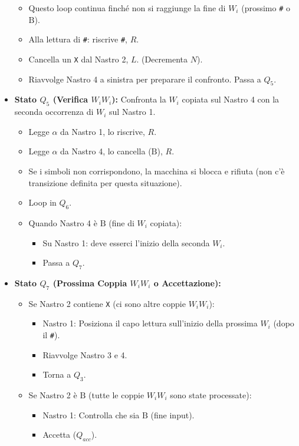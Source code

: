 \documentclass[a4paper]{article}
\newcommand{\B}{\text{B}} %
\begin{document}
\begin{itemize}
\begin{itemize}
            \item Questo loop continua finché non si raggiunge la fine di $W_i$ (prossimo \texttt{\#} o $\B$).
            \item Alla lettura di \texttt{\#}: riscrive \texttt{\#}, $R$.
            \item Cancella un \texttt{X} dal Nastro 2, $L$. (Decrementa $N$).
            \item Riavvolge Nastro 4 a sinistra per preparare il confronto. Passa a $Q_5$.
        \end{itemize}
    \item \textbf{Stato $Q_5$ (Verifica $W_i W_i$):}
        Confronta la $W_i$ copiata sul Nastro 4 con la seconda occorrenza di $W_i$ sul Nastro 1.
        \begin{itemize}
            \item Legge $\alpha$ da Nastro 1, lo riscrive, $R$.
            \item Legge $\alpha$ da Nastro 4, lo cancella ($\B$), $R$.
            \item Se i simboli non corrispondono, la macchina si blocca e rifiuta (non c'è transizione definita per questa situazione).
            \item Loop in $Q_6$.
            \item Quando Nastro 4 è $\B$ (fine di $W_i$ copiata):
                \begin{itemize}
                    \item Su Nastro 1: deve esserci l'inizio della seconda $W_i$.
                    \item Passa a $Q_7$.
                \end{itemize}
        \end{itemize}
    \item \textbf{Stato $Q_7$ (Prossima Coppia $W_i W_i$ o Accettazione):}
        \begin{itemize}
            \item Se Nastro 2 contiene \texttt{X} (ci sono altre coppie $W_i W_i$):
                \begin{itemize}
                    \item Nastro 1: Posiziona il capo lettura sull'inizio della prossima $W_i$ (dopo il \texttt{\#}).
                    \item Riavvolge Nastro 3 e 4.
                    \item Torna a $Q_3$.
                \end{itemize}
            \item Se Nastro 2 è $\B$ (tutte le coppie $W_i W_i$ sono state processate):
                \begin{itemize}
                    \item Nastro 1: Controlla che sia $\B$ (fine input).
                    \item Accetta ($Q_{acc}$).
                \end{itemize}
        \end{itemize}
\end{itemize}
\end{document}
